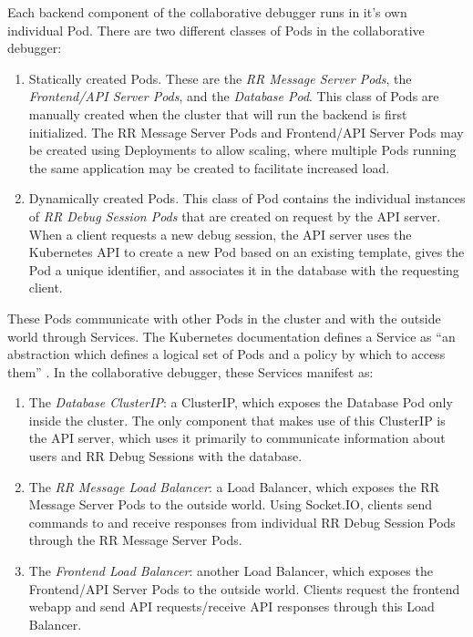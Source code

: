 \documentclass[12pt]{article}
\begin{document}
Each backend component of the collaborative debugger runs in it's own
individual Pod.  There are two different classes of Pods in the
collaborative debugger:

\begin{enumerate}
\item Statically created Pods.  These are the \textit{RR Message
    Server Pods}, the \textit{Frontend/API Server Pods}, and the
  \textit{Database Pod}.  This class of Pods are manually created when
  the cluster that will run the backend is first initialized.  The RR
  Message Server Pods and Frontend/API Server Pods may be created
  using Deployments \cite{k8s_docs} to allow scaling, where multiple
  Pods running the same application may be created to facilitate
  increased load.
\item Dynamically created Pods.  This class of Pod contains the
  individual instances of \textit{RR Debug Session Pods} that are
  created on request by the API server.  When a client requests a new
  debug session, the API server uses the Kubernetes API to create a
  new Pod based on an existing template, gives the Pod a unique
  identifier, and associates it in the database with the requesting
  client.
\end{enumerate}

These Pods communicate with other Pods in the cluster and with the
outside world through Services.  The Kubernetes documentation defines
a Service as ``an abstraction which defines a logical set of Pods and
a policy by which to access them'' \cite{k8s_docs}.  In the
collaborative debugger, these Services manifest as:

\begin{enumerate}
\item The \textit{Database ClusterIP}: a ClusterIP, which exposes the
  Database Pod only inside the cluster.  The only component that makes
  use of this ClusterIP is the API server, which uses it primarily to
  communicate information about users and RR Debug Sessions with the
  database.
\item The \textit{RR Message Load Balancer}: a Load Balancer, which
  exposes the RR Message Server Pods to the outside world.  Using
  Socket.IO, clients send commands to and receive responses from
  individual RR Debug Session Pods through the RR Message Server Pods.
\item The \textit{Frontend Load Balancer}: another Load Balancer,
  which exposes the Frontend/API Server Pods to the outside world.
  Clients request the frontend webapp and send API requests/receive
  API responses through this Load Balancer.
\end{enumerate}
\end{document}
